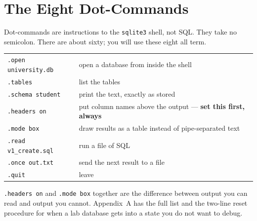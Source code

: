 \section{The Eight Dot-Commands}

Dot-commands are instructions to the \texttt{sqlite3} shell, not SQL. They take
no semicolon. There are about sixty; you will use these eight all term.

\begin{examplebox}
\begin{tabular}{@{}L{4.3cm}L{9.7cm}@{}}
\texttt{.open university.db} & open a database from inside the shell \\
\texttt{.tables}             & list the tables \\
\texttt{.schema student}     & print the  text, exactly as stored \\
\texttt{.headers on}         & put column names above the output --- \textbf{set this first, always} \\
\texttt{.mode box}           & draw results as a table instead of pipe-separated text \\
\texttt{.read v1\_create.sql}& run a file of SQL \\
\texttt{.once out.txt}       & send the next result to a file \\
\texttt{.quit}               & leave \\
\end{tabular}

\smallskip
\texttt{.headers on} and \texttt{.mode box} together are the difference
between output you can read and output you cannot. Appendix~A has the full
list and the two-line reset procedure for when a lab database gets into a
state you do not want to debug.
\end{examplebox}

